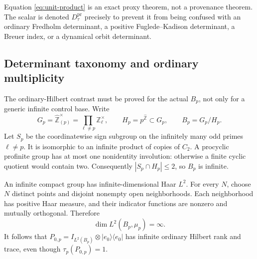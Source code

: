 \documentclass[11pt,a4paper]{article}
\theoremstyle{definition}
\newcommand{\Z}{\mathbb Z}
\newcommand{\whZ}{\widehat{\Z}}
\newcommand{\Dtau}{D^{\mathrm{pr}}_{\tau}}
\begin{document}
Equation \eqref{eq:unit-product} is an exact proxy theorem, not a provenance
theorem.  The scalar is denoted $\Dtau$ precisely to prevent it from being
confused with an ordinary Fredholm determinant, a positive
Fuglede--Kadison determinant, a Breuer index, or a dynamical orbit
determinant.

\subsection{Determinant taxonomy and ordinary multiplicity}
\label{sec:det-taxonomy}

The ordinary-Hilbert contrast must be proved for the actual $B_p$, not only
for a generic infinite control base.  Write
\[
 G_p=\whZ_{(p)}^\times=\prod_{\ell\neq p}\Z_\ell^\times,
 \qquad H_p=p^{\whZ}\subset G_p,
 \qquad B_p=G_p/H_p .
\]
Let $S_p$ be the coordinatewise sign subgroup on the infinitely many odd
primes $\ell\neq p$.  It is isomorphic to an infinite product of copies of
$C_2$.  A procyclic profinite group has at most one nonidentity involution:
otherwise a finite cyclic quotient would contain two.  Consequently
$|S_p\cap H_p|\leq2$, so $B_p$ is infinite.

An infinite compact group has infinite-dimensional Haar $L^2$.  For every
$N$, choose $N$ distinct points and disjoint nonempty open neighborhoods.
Each neighborhood has positive Haar measure, and their indicator functions
are nonzero and mutually orthogonal.  Therefore
\begin{equation}
 \dim L^2(B_p,\mu_p)=\infty .
 \label{eq:Bp-infinite-L2}
\end{equation}
It follows that $P_{0,p}=I_{L^2(B_p)}\otimes|e_0\rangle\langle e_0|$ has
infinite ordinary Hilbert rank and trace, even though $\tau_p(P_{0,p})=1$.
\end{document}
